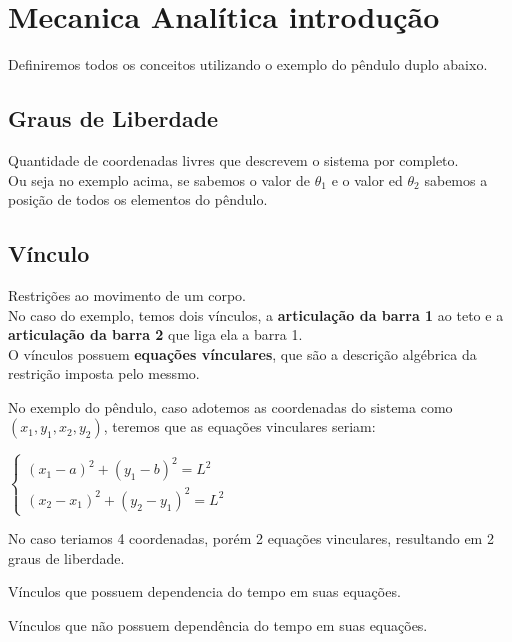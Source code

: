 \section{Mecanica Analítica introdução}

Definiremos todos os conceitos utilizando o exemplo do pêndulo duplo abaixo.

\subsection{Graus de Liberdade}

Quantidade de coordenadas livres que descrevem o sistema por completo. \\Ou seja no exemplo acima, se sabemos o valor de $\theta_1$ e o valor ed $\theta_2$ sabemos a posição de todos os elementos do pêndulo.

\subsection{Vínculo}

Restrições ao movimento de um corpo.\\
No caso do exemplo, temos dois vínculos, a \textbf{articulação da barra 1} ao teto e a \textbf{articulação da barra 2} que liga ela a barra 1.\\

O vínculos possuem \textbf{equações vínculares}, que são a descrição algébrica da restrição imposta pelo messmo.

No exemplo do pêndulo, caso adotemos as coordenadas do sistema como $(x_1, y_1, x_2, y_2)$, teremos que as equações vinculares seriam:

$\begin{cases} (x_1 - a)^2 + (y_1 - b)^2 = L^2 \\ (x_2 - x_1)^2 + (y_2 - y_1)^2 = L^2 \end{cases}$

No caso teriamos 4 coordenadas, porém 2 equações vinculares, resultando em 2 graus de liberdade.

\begin{namedtheorem}
  Vínculos que possuem dependencia do tempo em suas equações.
\end{namedtheorem}

\begin{namedtheorem}
  Vínculos que não possuem dependência do tempo em suas equações.
\end{namedtheorem}

